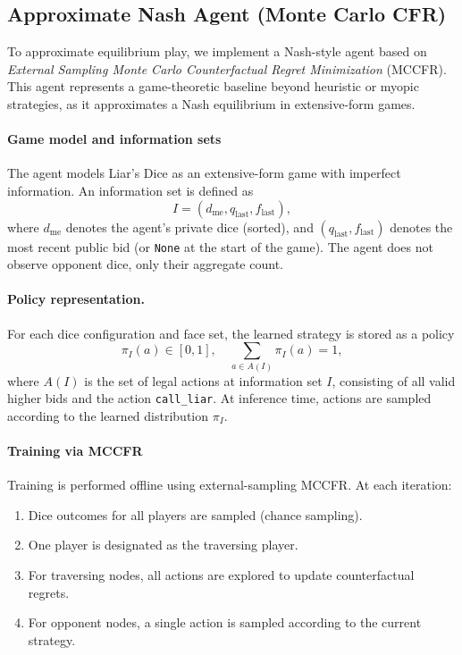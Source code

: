 \subsection{Approximate Nash Agent (Monte Carlo CFR)}
\label{app:mccfr_agent}

To approximate equilibrium play, we implement a Nash-style agent based on \emph{External Sampling Monte Carlo Counterfactual Regret Minimization} (MCCFR)\cite{mccfr}. This agent represents a game-theoretic baseline beyond heuristic or myopic strategies, as it approximates a Nash equilibrium in extensive-form games.

\paragraph{\textbf{Game model and information sets}}
The agent models Liar’s Dice as an extensive-form game with imperfect information. An information set is defined as
\[
I = (d_{\text{me}}, q_{\text{last}}, f_{\text{last}}),
\]
where \( d_{\text{me}} \) denotes the agent’s private dice (sorted), and \( (q_{\text{last}}, f_{\text{last}}) \) denotes the most recent public bid (or \texttt{None} at the start of the game). The agent does not observe opponent dice, only their aggregate count.

\paragraph{Policy representation.}
For each dice configuration and face set, the learned strategy is stored as a policy
\[
\pi_I(a) \in [0,1],
\quad \sum_{a \in A(I)} \pi_I(a) = 1,
\]
where \( A(I) \) is the set of legal actions at information set \( I \), consisting of all valid higher bids and the action \texttt{call\_liar}. At inference time, actions are sampled according to the learned distribution \( \pi_I \).

\paragraph{\textbf{Training via MCCFR}}
Training is performed offline using external-sampling MCCFR. At each iteration:
\begin{enumerate}
    \item Dice outcomes for all players are sampled (chance sampling).
    \item One player is designated as the traversing player.
    \item For traversing nodes, all actions are explored to update counterfactual regrets.
    \item For opponent nodes, a single action is sampled according to the current strategy.
\end{enumerate}

